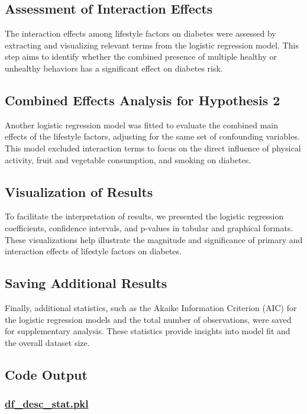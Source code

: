 \documentclass[11pt]{article}
\begin{document}
\subsection{Assessment of Interaction Effects}
The interaction effects among lifestyle factors on diabetes were assessed by extracting and visualizing relevant terms from the logistic regression model. This step aims to identify whether the combined presence of multiple healthy or unhealthy behaviors has a significant effect on diabetes risk.

\subsection{Combined Effects Analysis for Hypothesis 2}
Another logistic regression model was fitted to evaluate the combined main effects of the lifestyle factors, adjusting for the same set of confounding variables. This model excluded interaction terms to focus on the direct influence of physical activity, fruit and vegetable consumption, and smoking on diabetes.

\subsection{Visualization of Results}
To facilitate the interpretation of results, we presented the logistic regression coefficients, confidence intervals, and p-values in tabular and graphical formats. These visualizations help illustrate the magnitude and significance of primary and interaction effects of lifestyle factors on diabetes.

\subsection{Saving Additional Results}
Finally, additional statistics, such as the Akaike Information Criterion (AIC) for the logistic regression models and the total number of observations, were saved for supplementary analysis. These statistics provide insights into model fit and the overall dataset size.

\subsection{Code Output}
\hypertarget{file-df-desc-stat-pkl}{}

\subsubsection*{\hyperlink{code-df-desc-stat-pkl}{df\_desc\_stat.pkl}}
\end{document}
